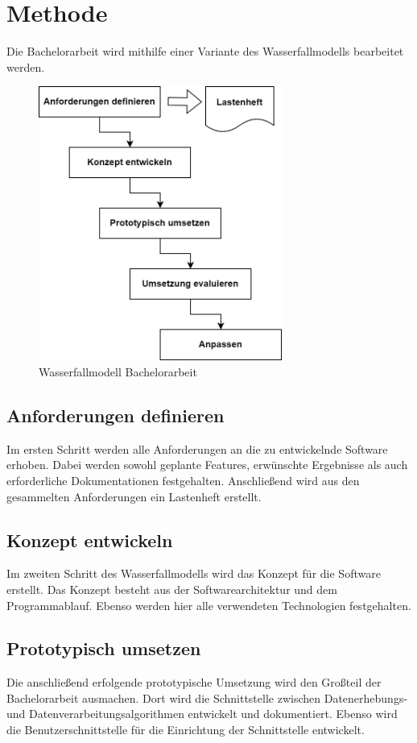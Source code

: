 \section{Methode}
Die Bachelorarbeit wird mithilfe einer Variante des Wasserfallmodells bearbeitet werden. 
\begin{figure}[H]
  \centering
    \includegraphics[width = 8cm]{bilder/wasserfallmodell}
    \caption{Wasserfallmodell Bachelorarbeit}
\end{figure}

\subsection{Anforderungen definieren}
Im ersten Schritt werden alle Anforderungen an die zu entwickelnde Software erhoben. Dabei werden sowohl geplante Features, erwünschte Ergebnisse als auch erforderliche Dokumentationen festgehalten. Anschließend wird aus den gesammelten Anforderungen ein Lastenheft erstellt.

\subsection{Konzept entwickeln}
Im zweiten Schritt des Wasserfallmodells wird das Konzept für die Software erstellt. Das Konzept besteht aus der Softwarearchitektur und dem Programmablauf. Ebenso werden hier alle verwendeten Technologien festgehalten.

\subsection{Prototypisch umsetzen}
Die anschließend erfolgende prototypische Umsetzung wird den Großteil der Bachelorarbeit ausmachen. Dort wird die Schnittstelle zwischen Datenerhebungs- und Datenverarbeitungsalgorithmen entwickelt und dokumentiert. Ebenso wird die Benutzerschnittstelle für die Einrichtung der Schnittstelle entwickelt.

